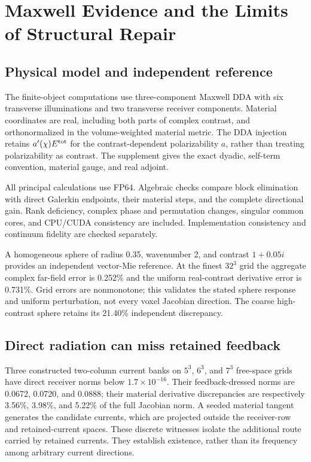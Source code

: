 \section{Maxwell Evidence and the Limits of Structural Repair}
\subsection{Physical model and independent reference}
The finite-object computations use three-component Maxwell DDA with six transverse illuminations and two transverse receiver components. Material coordinates are real, including both parts of complex contrast, and orthonormalized in the volume-weighted material metric. The DDA injection retains $a'(\chi)E^{\rm tot}$ for the contrast-dependent polarizability $a$, rather than treating polarizability as contrast. The supplement gives the exact dyadic, self-term convention, material gauge, and real adjoint.

All principal calculations use FP64. Algebraic checks compare block elimination with direct Galerkin endpoints, their material steps, and the complete directional gain. Rank deficiency, complex phase and permutation changes, singular common cores, and CPU/CUDA consistency are included. Implementation consistency and continuum fidelity are checked separately.

A homogeneous sphere of radius 0.35, wavenumber 2, and contrast $1+0.05i$ provides an independent vector-Mie reference. At the finest $32^3$ grid the aggregate complex far-field error is 0.252\% and the uniform real-contrast derivative error is 0.731\%. Grid errors are nonmonotone; this validates the stated sphere response and uniform perturbation, not every voxel Jacobian direction. The coarse high-contrast sphere retains its 21.40\% independent discrepancy.

\subsection{Direct radiation can miss retained feedback}
Three constructed two-column current banks on $5^3$, $6^3$, and $7^3$ free-space grids have direct receiver norms below $1.7\times10^{-16}$. Their feedback-dressed norms are 0.0672, 0.0720, and 0.0888; their material derivative discrepancies are respectively 3.56\%, 3.98\%, and 5.22\% of the full Jacobian norm. A seeded material tangent generates the candidate currents, which are projected outside the receiver-row and retained-current spaces. These discrete witnesses isolate the additional route carried by retained currents. They establish existence, rather than its frequency among arbitrary current directions.

